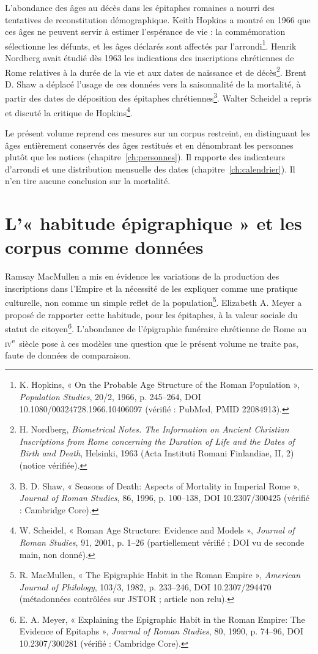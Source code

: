 L’abondance des âges au décès dans les épitaphes romaines a nourri des tentatives de reconstitution démographique. Keith Hopkins a montré en 1966 que ces âges ne peuvent servir à estimer l’espérance de vie : la commémoration sélectionne les défunts, et les âges déclarés sont affectés par l’arrondi\footnote{K. Hopkins, « On the Probable Age Structure of the Roman Population », \emph{Population Studies}, 20/2, 1966, p. 245–264, DOI 10.1080/00324728.1966.10406097 (vérifié : PubMed, PMID 22084913).}. Henrik Nordberg avait étudié dès 1963 les indications des inscriptions chrétiennes de Rome relatives à la durée de la vie et aux dates de naissance et de décès\footnote{H. Nordberg, \emph{Biometrical Notes. The Information on Ancient Christian Inscriptions from Rome concerning the Duration of Life and the Dates of Birth and Death}, Helsinki, 1963 (Acta Instituti Romani Finlandiae, II, 2) (notice vérifiée).}. Brent D. Shaw a déplacé l’usage de ces données vers la saisonnalité de la mortalité, à partir des dates de déposition des épitaphes chrétiennes\footnote{B. D. Shaw, « Seasons of Death: Aspects of Mortality in Imperial Rome », \emph{Journal of Roman Studies}, 86, 1996, p. 100–138, DOI 10.2307/300425 (vérifié : Cambridge Core).}. Walter Scheidel a repris et discuté la critique de Hopkins\footnote{W. Scheidel, « Roman Age Structure: Evidence and Models », \emph{Journal of Roman Studies}, 91, 2001, p. 1–26 (partiellement vérifié ; DOI vu de seconde main, non donné).}.

Le présent volume reprend ces mesures sur un corpus restreint, en distinguant les âges entièrement conservés des âges restitués et en dénombrant les personnes plutôt que les notices (chapitre~\ref{ch:personnes}). Il rapporte des indicateurs d’arrondi et une distribution mensuelle des dates (chapitre~\ref{ch:calendrier}). Il n’en tire aucune conclusion sur la mortalité.

\section{L’« habitude épigraphique » et les corpus comme données}

Ramsay MacMullen a mis en évidence les variations de la production des inscriptions dans l’Empire et la nécessité de les expliquer comme une pratique culturelle, non comme un simple reflet de la population\footnote{R. MacMullen, « The Epigraphic Habit in the Roman Empire », \emph{American Journal of Philology}, 103/3, 1982, p. 233–246, DOI 10.2307/294470 (métadonnées contrôlées sur JSTOR ; article non relu).}. Elizabeth A. Meyer a proposé de rapporter cette habitude, pour les épitaphes, à la valeur sociale du statut de citoyen\footnote{E. A. Meyer, « Explaining the Epigraphic Habit in the Roman Empire: The Evidence of Epitaphs », \emph{Journal of Roman Studies}, 80, 1990, p. 74–96, DOI 10.2307/300281 (vérifié : Cambridge Core).}. L’abondance de l’épigraphie funéraire chrétienne de Rome au \textsc{iv}\textsuperscript{e}~siècle pose à ces modèles une question que le présent volume ne traite pas, faute de données de comparaison.

